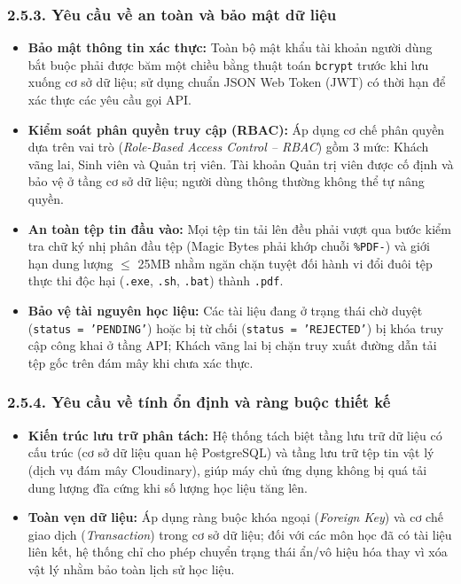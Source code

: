 \subsubsection{2.5.3. Yêu cầu về an toàn và bảo mật dữ liệu}
\begin{itemize}[leftmargin=*,noitemsep]
    \item \textbf{Bảo mật thông tin xác thực:} Toàn bộ mật khẩu tài khoản người dùng bắt buộc phải được băm một chiều bằng thuật toán \texttt{bcrypt} trước khi lưu xuống cơ sở dữ liệu; sử dụng chuẩn JSON Web Token (JWT) có thời hạn để xác thực các yêu cầu gọi API.
    \item \textbf{Kiểm soát phân quyền truy cập (RBAC):} Áp dụng cơ chế phân quyền dựa trên vai trò (\textit{Role-Based Access Control -- RBAC}) gồm 3 mức: Khách vãng lai, Sinh viên và Quản trị viên. Tài khoản Quản trị viên được cố định và bảo vệ ở tầng cơ sở dữ liệu; người dùng thông thường không thể tự nâng quyền.
    \item \textbf{An toàn tệp tin đầu vào:} Mọi tệp tin tải lên đều phải vượt qua bước kiểm tra chữ ký nhị phân đầu tệp (Magic Bytes phải khớp chuỗi \texttt{\%PDF-}) và giới hạn dung lượng $\le$ 25MB nhằm ngăn chặn tuyệt đối hành vi đổi đuôi tệp thực thi độc hại (\texttt{.exe}, \texttt{.sh}, \texttt{.bat}) thành \texttt{.pdf}.
    \item \textbf{Bảo vệ tài nguyên học liệu:} Các tài liệu đang ở trạng thái chờ duyệt (\texttt{status = 'PENDING'}) hoặc bị từ chối (\texttt{status = 'REJECTED'}) bị khóa truy cập công khai ở tầng API; Khách vãng lai bị chặn truy xuất đường dẫn tải tệp gốc trên đám mây khi chưa xác thực.
\end{itemize}

\subsubsection{2.5.4. Yêu cầu về tính ổn định và ràng buộc thiết kế}
\begin{itemize}[leftmargin=*,noitemsep]
    \item \textbf{Kiến trúc lưu trữ phân tách:} Hệ thống tách biệt tầng lưu trữ dữ liệu có cấu trúc (cơ sở dữ liệu quan hệ PostgreSQL) và tầng lưu trữ tệp tin vật lý (dịch vụ đám mây Cloudinary), giúp máy chủ ứng dụng không bị quá tải dung lượng đĩa cứng khi số lượng học liệu tăng lên.
    \item \textbf{Toàn vẹn dữ liệu:} Áp dụng ràng buộc khóa ngoại (\textit{Foreign Key}) và cơ chế giao dịch (\textit{Transaction}) trong cơ sở dữ liệu; đối với các môn học đã có tài liệu liên kết, hệ thống chỉ cho phép chuyển trạng thái ẩn/vô hiệu hóa thay vì xóa vật lý nhằm bảo toàn lịch sử học liệu.
\end{itemize}

